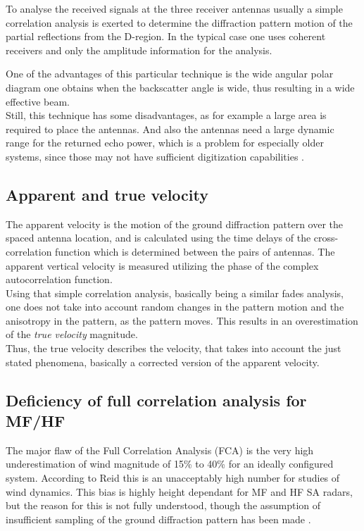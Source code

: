 To analyse the received signals at the three receiver antennas usually a simple correlation analysis is exerted to determine the diffraction pattern motion of the partial reflections from the D-region. In the typical case one uses coherent receivers and only the amplitude information for the analysis.

One of the advantages of this particular technique is the wide angular polar diagram one obtains when the backscatter angle is wide, thus resulting in a wide effective beam.\\
Still, this technique has some disadvantages, as for example a large area is required to place the antennas. And also the antennas need a large dynamic range for the returned echo power, which is a problem for especially older systems, since those may not have sufficient digitization capabilities \citep{reid2015mf}.

\subsection{Apparent and true velocity}
The apparent velocity is the motion of the ground diffraction pattern over the spaced antenna location, and is calculated using the time delays of the cross-correlation function which is determined between the pairs of antennas. The apparent vertical velocity is measured utilizing the phase of the complex autocorrelation function. \\
Using that simple correlation analysis, basically being a similar fades analysis, one does not take into account random changes in the pattern motion and the anisotropy in the pattern, as the pattern moves. This results in an overestimation of the \textit{true velocity} magnitude. \\
Thus, the true velocity describes the velocity, that takes into account the just stated phenomena, basically a corrected version of the apparent velocity.


\subsection{Deficiency of full correlation analysis for MF/HF}

The major flaw of the Full Correlation Analysis (FCA) is the very high underestimation of wind magnitude of 15\% to 40\% for an ideally configured system. According to Reid \citep{reid2015mf} this is an unacceptably high number for studies of wind dynamics. This bias is highly height dependant for MF and HF SA radars, but the reason for this is not fully understood, though the assumption of insufficient sampling of the ground diffraction pattern has been made \citep{reid2015mf}.






